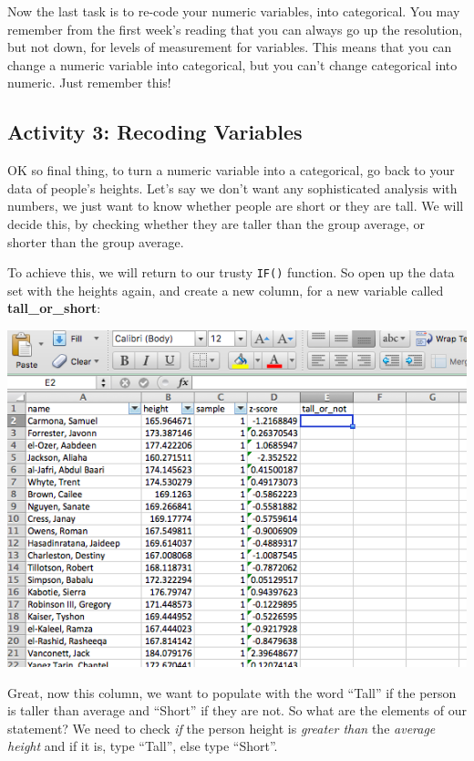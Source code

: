 \documentclass[]{book}
\theoremstyle{definition}
\theoremstyle{definition}
\theoremstyle{definition}
\theoremstyle{remark}
\begin{document}
Now the last task is to re-code your numeric variables, into
categorical. You may remember from the first week's reading that you can
always go up the resolution, but not down, for levels of measurement for
variables. This means that you can change a numeric variable into
categorical, but you can't change categorical into numeric. Just
remember this!

\hypertarget{activity-3-recoding-variables}{%
\subsection{Activity 3: Recoding
Variables}\label{activity-3-recoding-variables}}

 OK so final thing, to turn a numeric variable into a categorical, go
back to your data of people's heights. Let's say we don't want any
sophisticated analysis with numbers, we just want to know whether people
are short or they are tall. We will decide this, by checking whether
they are taller than the group average, or shorter than the group
average.

To achieve this, we will return to our trusty \texttt{IF()} function. So
open up the data set with the heights again, and create a new column,
for a new variable called \textbf{tall\_or\_short}:

\includegraphics{imgs/tall_or_not_col.png}

Great, now this column, we want to populate with the word ``Tall'' if
the person is taller than average and ``Short'' if they are not. So what
are the elements of our statement? We need to check \emph{if} the person
height is \emph{greater than} the \emph{average height} and if it is,
type ``Tall'', else type ``Short''.
\end{document}
